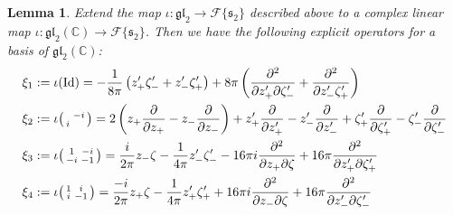 \documentclass[reqno, 11pt]{amsart} %
\numberwithin{equation}{section}
\theoremstyle{plain}
\newtheorem{lemma}[theorem]{Lemma}
\theoremstyle{definition}
\theoremstyle{remark}
\newcommand{\bbC}{\mathbb C}
\newcommand{\calF}{\mathcal F}
\newcommand{\lie}[1]{ \mathfrak{#1}}
\begin{document}
\begin{lemma} \label{lem:orth ops gl2}
Extend the map $\iota \colon \lie{gl}_2 \to \calF\{ \lie s_2\}$ described above to a complex linear map $\iota \colon \lie{gl}_2(\mathbb C) \to \calF\{ \lie s_2\}$. Then we have the following explicit operators for a basis of $\lie{gl}_2(\bbC)$:
\begin{align*}
\xi_1& := \iota (\mathrm{Id}) = - \frac{1}{8 \pi} \left( z_+' \zeta_-' + z_-' \zeta_+' \right)   +  8 \pi \left( \frac{\partial^2}{\partial z_+' \partial \zeta_-'} + \frac{\partial^2}{\partial z_-' \zeta_+'} \right) \\
\xi_2 &:= \iota \begin{psmallmatrix} & -i \\ i & \end{psmallmatrix}  =   2 \left( z_+ \frac{\partial}{\partial {z_+}}-  z_- \frac{\partial}{\partial {z_-}} \right)	+  z'_+ \frac{\partial}{\partial {z_+'}} -  z_-' \frac{\partial}{\partial {z_-'}} +  \zeta_+' \frac{\partial}{\partial {\zeta_+'}} -  \zeta_-' \frac{\partial}{\partial {\zeta_-'}} \\
\xi_3 &:= \iota \begin{psmallmatrix} 1&-i\\-i & -1 \end{psmallmatrix} = \frac{i}{2 \pi} z_- \zeta - \frac{1}{4 \pi }z_-'\zeta_-' - 16 \pi i \frac{\partial^2}{\partial z_+ \partial \zeta}+ 16 \pi \frac{\partial^2}{\partial z_+'  \partial \zeta_+'} \\
\xi_4 & := \iota  \begin{psmallmatrix} 1&i\\i & -1 \end{psmallmatrix}  =  \frac{-i}{2 \pi} z_+ \zeta - \frac{1}{4 \pi }z_+'\zeta_+' + 16 \pi i \frac{\partial^2}{\partial z_- \partial \zeta}+ 16 \pi \frac{\partial^2}{\partial z_-'  \partial \zeta_-'}
\end{align*}


\end{lemma}
\end{document}
